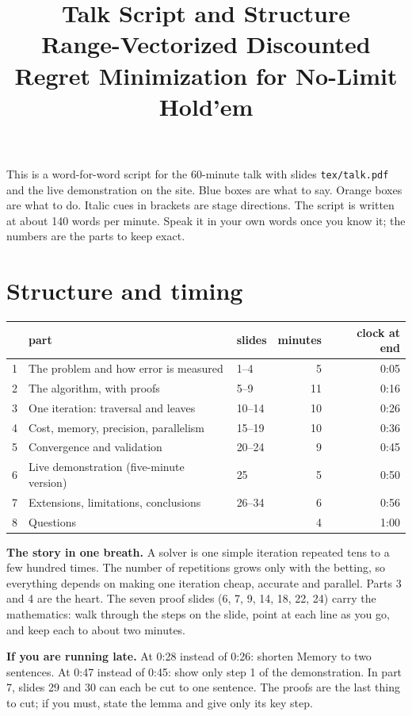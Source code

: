 \documentclass[11pt]{article}
\title{Talk Script and Structure\\[4pt]\large Range-Vectorized Discounted Regret Minimization for No-Limit Hold'em}
\author{}\date{}
\begin{document}
\maketitle
\vspace{-3em}
This is a word-for-word script for the 60-minute talk with slides \texttt{tex/talk.pdf} and the live demonstration
on the site. Blue boxes are what to say. Orange boxes are what to do. Italic cues in brackets are stage directions.
The script is written at about 140 words per minute. Speak it in your own words once you know it; the numbers are
the parts to keep exact.

\tableofcontents

\section{Structure and timing}
\begin{center}
\begin{tabular}{rllrr}
\toprule
& part & slides & minutes & clock at end\\ \midrule
1 & The problem and how error is measured & 1--4 & 5 & 0:05\\
2 & The algorithm, with proofs & 5--9 & 11 & 0:16\\
3 & One iteration: traversal and leaves & 10--14 & 10 & 0:26\\
4 & Cost, memory, precision, parallelism & 15--19 & 10 & 0:36\\
5 & Convergence and validation & 20--24 & 9 & 0:45\\
6 & Live demonstration (five-minute version) & 25 & 5 & 0:50\\
7 & Extensions, limitations, conclusions & 26--34 & 6 & 0:56\\
8 & Questions & & 4 & 1:00\\ \bottomrule
\end{tabular}
\end{center}

\textbf{The story in one breath.} A solver is one simple iteration repeated tens to a few hundred times. The number of
repetitions grows only with the betting, so everything depends on making one iteration cheap, accurate and parallel.
Parts 3 and 4 are the heart. The seven proof slides (6, 7, 9, 14, 18, 22, 24) carry the mathematics: walk through the
steps on the slide, point at each line as you go, and keep each to about two minutes.

\textbf{If you are running late.} At 0:28 instead of 0:26: shorten Memory to two sentences. At 0:47 instead of
0:45: show only step 1 of the demonstration. In part 7, slides 29 and 30 can each be cut to one sentence. The proofs
are the last thing to cut; if you must, state the lemma and give only its key step.
\end{document}

